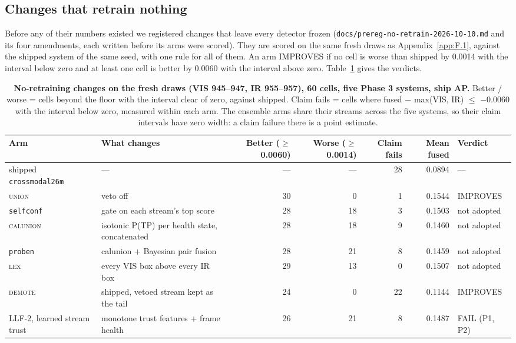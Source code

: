 \documentclass[10pt]{article}
\begin{document}
\subsection{Changes that retrain nothing}\label{app:F.2}
Before any of their numbers existed we registered changes that leave every detector frozen (\texttt{docs/\allowbreak{}prereg-no-retrain-2026-10-10.md} and its four amendments, each written before its arms were scored). They are scored on the same fresh draws as Appendix~\ref{app:F.1}, against the shipped system of the same seed, with one rule for all of them. An arm IMPROVES if no cell is worse than shipped by 0.0014 with the interval below zero and at least one cell is better by 0.0060 with the interval above zero. Table~\ref{tab:15} gives the verdicts.

\begin{table}[htbp]
\centering
\footnotesize
\caption{\textbf{No-retraining changes on the fresh draws (VIS 945--947, IR 955--957), 60 cells, five Phase 3 systems, ship AP.} Better / worse = cells beyond the floor with the interval clear of zero, against shipped. Claim fails = cells where fused $-$ max(VIS, IR) $\leq$ $-$0.0060 with the interval below zero, measured within each arm. The ensemble arms share their streams across the five systems, so their claim intervals have zero width: a claim failure there is a point estimate.}
\label{tab:15}
\setlength{\tabcolsep}{3pt}
\begin{tabularx}{\linewidth}{l>{\raggedright\arraybackslash}Xrrrrl}
\toprule
Arm & What changes & Better ($\geq$0.0060) & Worse ($\geq$0.0014) & Claim fails & Mean fused & Verdict \\
\midrule
shipped \texttt{crossmodal26m} & --- & --- & --- & 28 & 0.0894 & --- \\
\textsc{union} & veto off & 30 & 0 & 1 & 0.1544 & IMPROVES \\
\texttt{selfconf} & gate on each stream's top score & 28 & 18 & 3 & 0.1503 & not adopted \\
\textsc{calunion} & isotonic P(TP) per health state, concatenated & 28 & 18 & 9 & 0.1460 & not adopted \\
\texttt{proben} & calunion + Bayesian pair fusion & 28 & 21 & 8 & 0.1459 & not adopted \\
\textsc{lex} & every VIS box above every IR box & 29 & 13 & 0 & 0.1507 & not adopted \\
\textsc{demote} & shipped, vetoed stream kept as the tail & 24 & 0 & 22 & 0.1144 & IMPROVES \\
LLF-2, learned stream trust & monotone trust features + frame health & 26 & 21 & 8 & 0.1487 & FAIL (P1, P2) \\

\end{tabularx}
\end{table}
\end{document}
